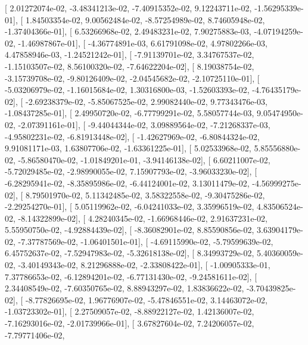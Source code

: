 \documentclass{article}
\begin{document}
       [  2.01272074e-02,  -3.48341213e-02,  -7.40915352e-02,
          9.12243711e-02,  -1.56295339e-01],
       [  1.84503354e-02,   9.00562484e-02,  -8.57254989e-02,
          8.74605948e-02,  -1.37404366e-01],
       [  6.53266968e-02,   2.49483231e-02,   7.90275883e-03,
         -4.07194259e-02,  -1.46987867e-01],
       [ -4.36774891e-03,   6.61791098e-02,   4.97802266e-03,
          4.47858946e-03,  -1.24521242e-01],
       [ -7.91139701e-02,   3.34767537e-02,  -1.15103507e-02,
          8.56100320e-02,  -7.64622204e-02],
       [  8.19038754e-02,  -3.15739708e-02,  -9.80126409e-02,
         -2.04545682e-02,  -2.10725110e-01],
       [ -5.03206979e-02,  -1.16015684e-02,   1.30316800e-03,
         -1.52603393e-02,  -4.76435179e-02],
       [ -2.69238379e-02,  -5.85067525e-02,   2.99082440e-02,
          9.77343476e-03,  -1.08437285e-01],
       [  2.49950720e-02,  -6.77799291e-02,   5.58057744e-03,
          9.05474950e-02,  -2.07391161e-01],
       [ -9.44044344e-02,   3.09889564e-02,  -7.21268337e-03,
         -4.95802231e-02,  -6.81913448e-02],
       [ -1.42627969e-02,  -6.80844324e-02,   9.91081171e-03,
          1.63807706e-02,  -1.63361225e-01],
       [  5.02533968e-02,   5.85556880e-02,  -5.86580470e-02,
         -1.01849201e-01,  -3.94146138e-02],
       [  6.60211007e-02,  -5.72029485e-02,  -2.98990055e-02,
          7.15907793e-02,  -3.96033230e-02],
       [ -6.28295941e-02,  -8.35895986e-02,  -6.44124001e-02,
          3.13011479e-02,  -4.56999275e-02],
       [  8.79501970e-02,   5.11342485e-02,   3.58322558e-02,
         -9.30475286e-02,  -2.29254270e-01],
       [  5.05119962e-02,  -6.04241033e-02,   3.35996519e-02,
          4.83506524e-02,  -8.14322899e-02],
       [  4.28240345e-02,  -1.66968446e-02,   2.91637231e-02,
          5.55950750e-02,  -4.92884439e-02],
       [ -8.36082901e-02,   8.85590856e-02,   3.63904179e-02,
         -7.37787569e-02,  -1.06401501e-01],
       [ -4.69115990e-02,  -5.79599639e-02,   6.45752637e-02,
         -7.52947983e-02,  -5.32618138e-02],
       [  8.34993729e-02,   5.40360059e-02,  -3.40149343e-02,
          8.21296888e-02,  -2.33808422e-01],
       [ -1.00905333e-01,   7.37786653e-02,  -6.12894201e-02,
         -6.77131430e-02,  -9.24581611e-02],
       [  2.34408549e-02,  -7.60350765e-02,   8.88943297e-02,
          1.83836622e-02,  -3.70439825e-02],
       [ -8.77826695e-02,   1.96776907e-02,  -5.47846551e-02,
          3.14463072e-02,  -1.03723302e-01],
       [  2.27509057e-02,  -8.88922127e-02,   1.42136007e-02,
         -7.16293016e-02,  -2.01739966e-01],
       [  3.67827604e-02,   7.24206057e-02,  -7.79771406e-02,
\end{document}
